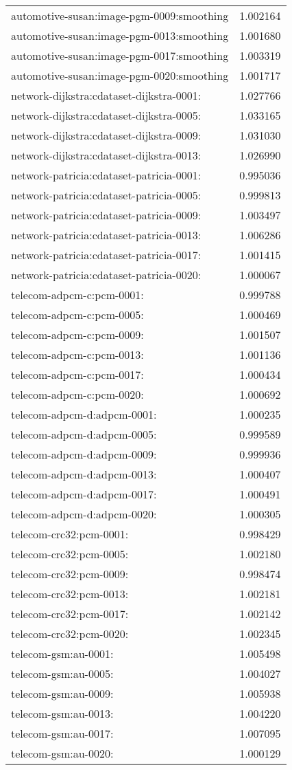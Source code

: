 \begin{longtable}{lr}
automotive-susan:image-pgm-0009:smoothing & 1.002164 \\
automotive-susan:image-pgm-0013:smoothing & 1.001680 \\
automotive-susan:image-pgm-0017:smoothing & 1.003319 \\
automotive-susan:image-pgm-0020:smoothing & 1.001717 \\
network-dijkstra:cdataset-dijkstra-0001: & 1.027766 \\
network-dijkstra:cdataset-dijkstra-0005: & 1.033165 \\
network-dijkstra:cdataset-dijkstra-0009: & 1.031030 \\
network-dijkstra:cdataset-dijkstra-0013: & 1.026990 \\
network-patricia:cdataset-patricia-0001: & 0.995036 \\
network-patricia:cdataset-patricia-0005: & 0.999813 \\
network-patricia:cdataset-patricia-0009: & 1.003497 \\
network-patricia:cdataset-patricia-0013: & 1.006286 \\
network-patricia:cdataset-patricia-0017: & 1.001415 \\
network-patricia:cdataset-patricia-0020: & 1.000067 \\
telecom-adpcm-c:pcm-0001: & 0.999788 \\
telecom-adpcm-c:pcm-0005: & 1.000469 \\
telecom-adpcm-c:pcm-0009: & 1.001507 \\
telecom-adpcm-c:pcm-0013: & 1.001136 \\
telecom-adpcm-c:pcm-0017: & 1.000434 \\
telecom-adpcm-c:pcm-0020: & 1.000692 \\
telecom-adpcm-d:adpcm-0001: & 1.000235 \\
telecom-adpcm-d:adpcm-0005: & 0.999589 \\
telecom-adpcm-d:adpcm-0009: & 0.999936 \\
telecom-adpcm-d:adpcm-0013: & 1.000407 \\
telecom-adpcm-d:adpcm-0017: & 1.000491 \\
telecom-adpcm-d:adpcm-0020: & 1.000305 \\
telecom-crc32:pcm-0001: & 0.998429 \\
telecom-crc32:pcm-0005: & 1.002180 \\
telecom-crc32:pcm-0009: & 0.998474 \\
telecom-crc32:pcm-0013: & 1.002181 \\
telecom-crc32:pcm-0017: & 1.002142 \\
telecom-crc32:pcm-0020: & 1.002345 \\
telecom-gsm:au-0001: & 1.005498 \\
telecom-gsm:au-0005: & 1.004027 \\
telecom-gsm:au-0009: & 1.005938 \\
telecom-gsm:au-0013: & 1.004220 \\
telecom-gsm:au-0017: & 1.007095 \\
telecom-gsm:au-0020: & 1.000129 \\
\end{longtable}
